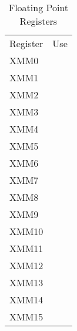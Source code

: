 \begin{table}
\caption{Floating Point Registers}
\begin{center}
\begin{tabular}{ll}
\hline\noalign{\smallskip}
Register & Use \\
\noalign{\smallskip}\hline\noalign{\smallskip}
XMM0& \\
XMM1 & \\
XMM2 & \\
XMM3 & \\
XMM4 & \\
XMM5 & \\
XMM6 & \\
XMM7 & \\
XMM8 & \\
XMM9 & \\
XMM10 & \\
XMM11 & \\
XMM12 & \\
XMM13 & \\
XMM14 & \\
XMM15 & \\
\hline
\end{tabular}
\end{center}
\end{table}

